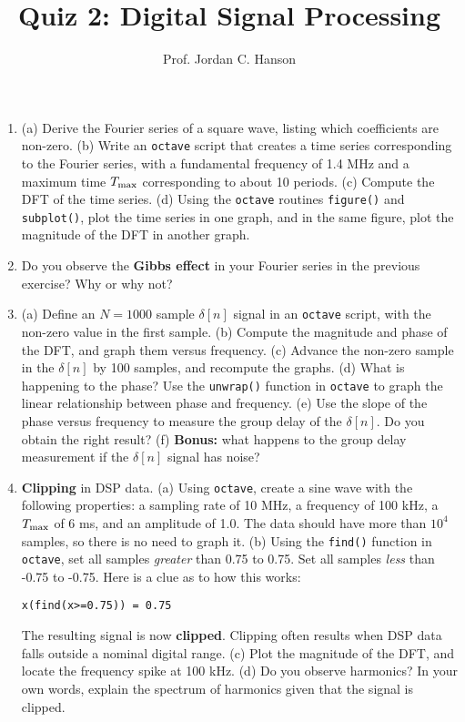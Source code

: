 \documentclass{article}
\begin{document}
\twocolumn

\title{Quiz 2: Digital Signal Processing}
\author{Prof. Jordan C. Hanson}

\maketitle
\small

\begin{enumerate}
\item (a) Derive the Fourier series of a square wave, listing which coefficients are non-zero. (b) Write an \verb+octave+ script that creates a time series corresponding to the Fourier series, with a fundamental frequency of 1.4 MHz and a maximum time $T_{\rm max}$ corresponding to about 10 periods. (c) Compute the DFT of the time series. (d) Using the \verb+octave+ routines \verb+figure()+ and \verb+subplot()+, plot the time series in one graph, and in the same figure, plot the magnitude of the DFT in another graph.
\item Do you observe the \textbf{Gibbs effect} in your Fourier series in the previous exercise?  Why or why not?
\item (a) Define an $N=1000$ sample $\delta[n]$ signal in an \verb+octave+ script, with the non-zero value in the first sample. (b) Compute the magnitude and phase of the DFT, and graph them versus frequency.  (c) Advance the non-zero sample in the $\delta[n]$ by 100 samples, and recompute the graphs. (d) What is happening to the phase?  Use the \verb+unwrap()+ function in \verb+octave+ to graph the linear relationship between phase and frequency. (e) Use the slope of the phase versus frequency to measure the group delay of the $\delta[n]$.  Do you obtain the right result? (f) \textbf{Bonus:} what happens to the group delay measurement if the $\delta[n]$ signal has noise?
\item \textbf{Clipping} in DSP data.  (a) Using \verb+octave+, create a sine wave with the following properties: a sampling rate of 10 MHz, a frequency of 100 kHz, a $T_{\rm max}$ of 6 ms, and an amplitude of 1.0.  The data should have more than $10^4$ samples, so there is no need to graph it. (b) Using the \verb+find()+ function in \verb+octave+, set all samples \textit{greater} than 0.75 to 0.75.  Set all samples \textit{less} than -0.75 to -0.75.  Here is a clue as to how this works:
\begin{verbatim}
x(find(x>=0.75)) = 0.75
\end{verbatim}
The resulting signal is now \textbf{clipped}. Clipping often results when DSP data falls outside a nominal digital range. (c) Plot the magnitude of the DFT, and locate the frequency spike at 100 kHz. (d) Do you observe harmonics?  In your own words, explain the spectrum of harmonics given that the signal is clipped.

\end{enumerate}
\end{document}
